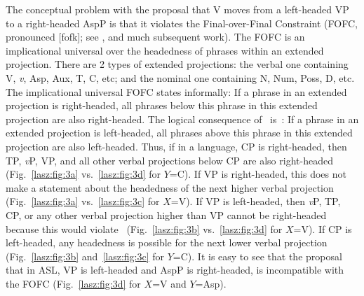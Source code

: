 \documentclass[output=paper]{langscibook}
\begin{document}
The conceptual problem with the proposal that V moves from a
left-headed VP to a right-headed AspP is that it violates the
Final-over-Final Constraint (FOFC, pronounced [fofk]; see 
\citealp{BiberauerHR.2014,SheehanBRH.2017}, and much subsequent work). The
FOFC is an implicational universal over the headedness of phrases
within an extended projection. There are 2 types of extended
projections: the verbal one containing V, \textit{v}, Asp, Aux, T, C, etc; and
the nominal one containing N, Num, Poss, D, etc. The implicational
universal FOFC states informally:
\ea 
    \label{lasz:ex:28}
     If a phrase in an extended projection is right-headed, all
    phrases below this phrase in this extended projection are also
    right-headed. \citep[after][]{BiberauerHR.2014}
\z 
The logical consequence of~ is~:
\ea 
    \label{lasz:ex:29}
    If a phrase in an extended projection is left-headed, all
    phrases above this phrase in this extended projection are also
    left-headed.
\z 
Thus, if in a language, CP is right-headed, then TP, \textit{v}P, VP, and all
other verbal projections below CP are also right-headed (Fig.~\ref{lasz:fig:3a} vs.~\ref{lasz:fig:3d}
for $Y$=C). If VP is right-headed, this does not make a statement about
the headedness of the next higher verbal projection (Fig.~\ref{lasz:fig:3a} vs.~\ref{lasz:fig:3c} for
$X$=V). If VP is left-headed, then \textit{v}P, TP, CP, or any other verbal
projection higher than VP cannot be right-headed because this would
violate~ (Fig.~\ref{lasz:fig:3b} vs.~\ref{lasz:fig:3d} for $X$=V). If CP is left-headed, any
headedness is possible for the next lower verbal projection (Fig.~\ref{lasz:fig:3b}
and~\ref{lasz:fig:3c} for $Y$=C). It is easy to see that the proposal that in ASL, VP is
left-headed and AspP is right-headed, is incompatible with the FOFC
(Fig.~\ref{lasz:fig:3d} for $X$=V and $Y$=Asp).
\end{document}
